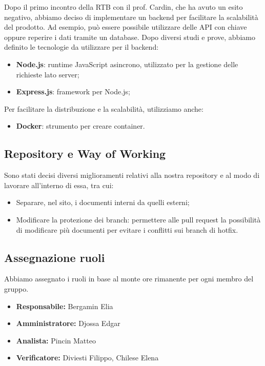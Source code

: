 Dopo il primo incontro della RTB con il prof. Cardin, che ha avuto un esito negativo, abbiamo deciso di implementare un backend per facilitare la scalabilità del prodotto. Ad esempio, può essere possibile utilizzare delle API con chiave oppure reperire i dati tramite un database. Dopo diversi studi e prove, abbiamo definito le tecnologie da utilizzare per il backend:

\begin{itemize}
\item \textbf{Node.js}: runtime JavaScript asincrono, utilizzato per la gestione delle richieste lato server;
\item \textbf{Express.js}: framework per Node.js;
\end{itemize}

Per facilitare la distribuzione e la scalabilità, utilizziamo anche:

\begin{itemize}
\item \textbf{Docker}: strumento per creare container.
\end{itemize}

\subsection{Repository e Way of Working}
Sono stati decisi diversi miglioramenti relativi alla nostra repository e al modo di lavorare all'interno di essa, tra cui:
\begin{itemize}
    \item Separare, nel sito, i documenti interni da quelli esterni;
    \item Modificare la protezione dei branch: permettere alle pull request la possibilità di modificare più documenti per evitare i conflitti sui branch di hotfix.
\end{itemize}

\subsection{Assegnazione ruoli}
Abbiamo assegnato i ruoli in base al monte ore rimanente per ogni membro del gruppo.

\begin{itemize}
    \item \textbf{Responsabile:}  Bergamin Elia
    \item \textbf{Amministratore:} Djossa Edgar
    \item \textbf{Analista:} Pincin Matteo
    \item \textbf{Verificatore:} Diviesti Filippo,  Chilese Elena
\end{itemize}

